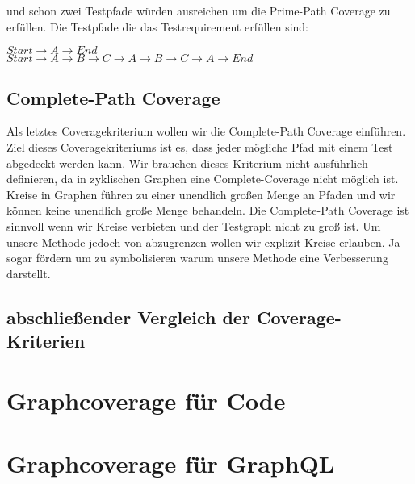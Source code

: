 und schon zwei Testpfade würden ausreichen um die Prime-Path Coverage zu erfüllen.
Die Testpfade die das Testrequirement erfüllen sind:

$Start \rightarrow A \rightarrow End$ \\
$Start \rightarrow A \rightarrow B \rightarrow C \rightarrow A \rightarrow B \rightarrow C \rightarrow A \rightarrow End$

\subsection{Complete-Path Coverage}

Als letztes Coveragekriterium wollen wir die Complete-Path Coverage einführen.
Ziel dieses Coveragekriteriums ist es, dass jeder mögliche Pfad mit einem Test abgedeckt werden kann.
Wir brauchen dieses Kriterium nicht ausführlich definieren, da in zyklischen Graphen eine Complete-Coverage nicht möglich ist.
Kreise in Graphen führen zu einer unendlich großen Menge an Pfaden und wir können keine unendlich große Menge behandeln.
Die Complete-Path Coverage ist sinnvoll wenn wir Kreise verbieten und der Testgraph nicht zu groß ist.
Um unsere Methode jedoch von \cite[Property-based Testing]{property-based-testing} abzugrenzen wollen wir explizit Kreise erlauben.
Ja sogar fördern um zu symbolisieren warum unsere Methode eine Verbesserung darstellt.


\subsection{abschließender Vergleich der Coverage-Kriterien}


\section{Graphcoverage für Code}

\section{Graphcoverage für GraphQL}




